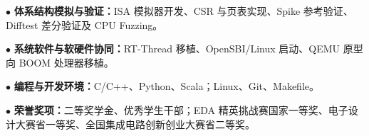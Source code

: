 \documentclass[11pt,a4paper,fontset=none]{ctexart}
\begin{document}
\noindent $\bullet$ \textbf{体系结构模拟与验证：}ISA 模拟器开发、CSR 与页表实现、Spike 参考验证、Difftest 差分验证及 CPU Fuzzing。

\noindent $\bullet$ \textbf{系统软件与软硬件协同：}RT-Thread 移植、OpenSBI/Linux 启动、QEMU 原型向 BOOM 处理器移植。

\noindent $\bullet$ \textbf{编程与开发环境：}C/C++、Python、Scala；Linux、Git、Makefile。

\noindent $\bullet$ \textbf{荣誉奖项：}二等奖学金、优秀学生干部；EDA 精英挑战赛国家一等奖、电子设计大赛省一等奖、全国集成电路创新创业大赛省二等奖。
\end{document}
